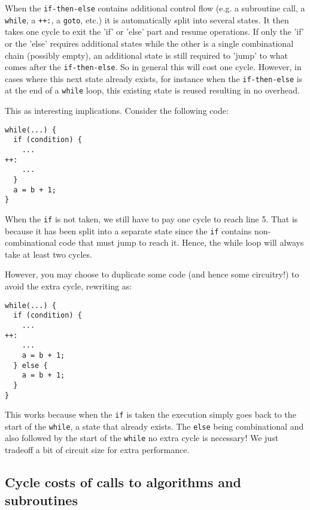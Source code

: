 \documentclass[a4]{article}
\begin{document}
When the \texttt{if-then-else} contains additional control flow (e.g. a subroutine call, a \texttt{while}, a \texttt{++:}, a \texttt{goto}, etc.) it is automatically split into several states. It then takes one cycle to exit the 'if' or 'else' part and resume operations.
If only the 'if' or the 'else' requires additional states while the other is a single combinational chain (possibly empty), an additional state is still required to 'jump' to what comes after the \texttt{if-then-else}. So in general this will cost one cycle. However, in cases where this next state already exists, for instance when the \texttt{if-then-else} is at the end of a \texttt{while} loop, this existing state is reused resulting in no overhead.

This as interesting implications. Consider the following code:

\begin{verbatim}
while(...) {
  if (condition) {
    ...
++:
    ...    
  }
  a = b + 1;
}
\end{verbatim}

When the \texttt{if} is not taken, we still have to pay one cycle to reach line 5. That is because it has been split into a separate state since the \texttt{if} contains non-combinational code that must jump to reach it. Hence, the while loop will always take at least two cycles.

However, you may choose to duplicate some code (and hence some circuitry!) to avoid the extra cycle, rewriting as:

\begin{verbatim}
while(...) {
  if (condition) {
    ...
++:
    ...    
    a = b + 1;
  } else {
    a = b + 1;
  }
}
\end{verbatim}

This works because when the \texttt{if} is taken the execution simply goes back to the start of the \texttt{while}, a state that already exists. The \texttt{else} being combinational and also followed by the start of the \texttt{while} no extra cycle is necessary! We just tradeoff a bit of circuit size for extra performance.


\subsection{Cycle costs of calls to algorithms and subroutines}
\end{document}

